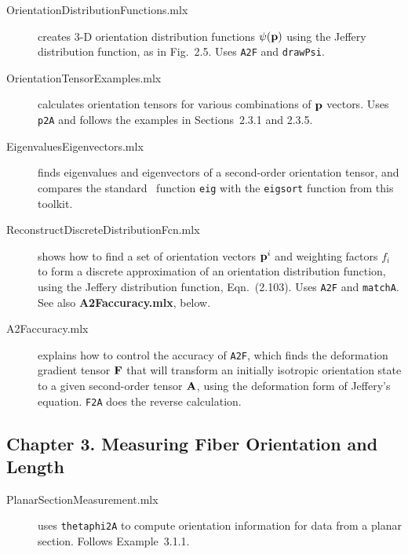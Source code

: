 \documentclass[11pt]{article}
\begin{document}
\begin{description}
    
    \item[OrientationDistributionFunctions.mlx]{creates 3-D orientation distribution functions $\psi(\mathbf{p})$ using the Jeffery distribution function, as in Fig.~2.5.  Uses \texttt{A2F} and \texttt{drawPsi}.}
    
    \item[OrientationTensorExamples.mlx]{calculates orientation tensors for various combinations of $\mathbf{p}$ vectors.  Uses \texttt{p2A} and follows the examples in Sections~2.3.1 and 2.3.5.}

    \item[EigenvaluesEigenvectors.mlx]{finds eigenvalues and eigenvectors of a second-order orientation tensor, and compares the standard \matlab\ function \texttt{eig} with the \texttt{eigsort} function from this toolkit.}
    
    \item[ReconstructDiscreteDistributionFcn.mlx]{shows how to find a set of orientation vectors $\mathbf{p}^i$ and weighting factors $f_i$ to form a discrete approximation of an orientation distribution function, using the Jeffery distribution function, Eqn.~(2.103).  Uses \texttt{A2F} and \texttt{matchA}.  See also \textbf{A2Faccuracy.mlx}, below.  }

        \item[A2Faccuracy.mlx]{explains how to control the accuracy of \texttt{A2F}, which finds the deformation gradient tensor $\mathbf{F}$ that will transform an initially isotropic orientation state to a given second-order tensor $\mathbf{A}$, using the deformation form of Jeffery's equation.  \texttt{F2A} does the reverse calculation.}    
        
\end{description}

\subsection*{Chapter 3.  Measuring Fiber Orientation and Length}

\begin{description}
    
    \item[PlanarSectionMeasurement.mlx]{uses \texttt{thetaphi2A} to compute orientation information for data from a planar section.  Follows Example~3.1.1.}
      
\end{description}
\end{document}

